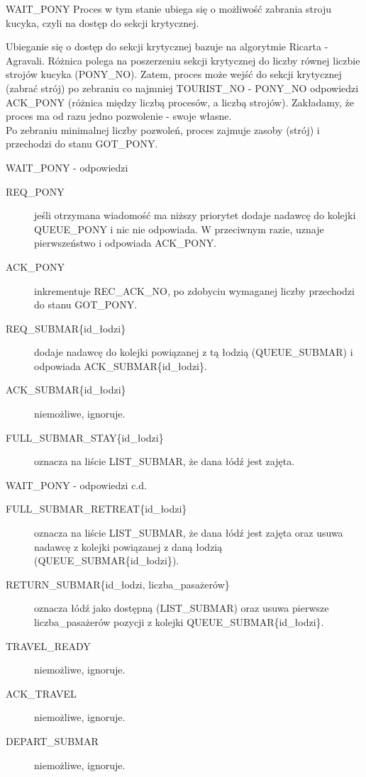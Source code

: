 \documentclass{beamer}
\begin{document}
\begin{frame}{WAIT\_PONY}
    \internallinenumbers
    \resetlinenumber[1]
    Proces w tym stanie ubiega się o  możliwość zabrania stroju kucyka, czyli na dostęp do sekcji krytycznej.

    \vspace{0.4cm}
    Ubieganie się o dostęp do sekcji krytycznej bazuje na algorytmie Ricarta - Agravali. Różnica polega na poszerzeniu sekcji krytycznej do liczby równej liczbie strojów kucyka (PONY\_NO). Zatem, proces może wejść do sekcji krytycznej (zabrać strój) po zebraniu co najmniej TOURIST\_NO - PONY\_NO odpowiedzi ACK\_PONY (różnica między liczbą procesów, a liczbą strojów). Zakładamy, że proces ma od razu jedno pozwolenie - swoje własne. \\
    Po zebraniu minimalnej liczby pozwoleń, proces zajmuje zasoby (strój) i przechodzi do stanu GOT\_PONY.
\end{frame}

\begin{frame}{WAIT\_PONY - odpowiedzi}
    \internallinenumbers
    \resetlinenumber[1]
    \begin{description}
        \item [REQ\_PONY] jeśli otrzymana wiadomość ma niższy priorytet dodaje nadawcę do kolejki QUEUE\_PONY i nic nie odpowiada. W przeciwnym razie, uznaje pierwszeństwo i odpowiada ACK\_PONY.
        \item [ACK\_PONY] inkrementuje REC\_ACK\_NO, po zdobyciu wymaganej liczby przechodzi do stanu GOT\_PONY.
        \item [REQ\_SUBMAR\{id\_łodzi\}] dodaje nadawcę do kolejki powiązanej z tą łodzią (QUEUE\_SUBMAR) i odpowiada ACK\_SUBMAR\{id\_łodzi\}.
        \item [ACK\_SUBMAR\{id\_łodzi\}] niemożliwe, ignoruje.
        \item [FULL\_SUBMAR\_STAY\{id\_łodzi\}] oznacza na liście LIST\_SUBMAR, że dana łódź jest zajęta.

    \end{description}
\end{frame}

\begin{frame}{WAIT\_PONY - odpowiedzi c.d.}
    \internallinenumbers
    \begin{description}
        \item [FULL\_SUBMAR\_RETREAT\{id\_łodzi\}] oznacza na liście LIST\_SUBMAR, że dana łódź jest zajęta oraz usuwa nadawcę z kolejki powiązanej z daną łodzią (QUEUE\_SUBMAR\{id\_łodzi\}).
        \item [RETURN\_SUBMAR\{id\_łodzi, liczba\_pasażerów\}] oznacza łódź jako dostępną (LIST\_SUBMAR) oraz usuwa pierwsze liczba\_pasażerów pozycji z kolejki QUEUE\_SUBMAR\{id\_łodzi\}.
        \item [TRAVEL\_READY] niemożliwe, ignoruje.
        \item [ACK\_TRAVEL] niemożliwe, ignoruje.
        \item [DEPART\_SUBMAR] niemożliwe, ignoruje.
    \end{description}
\end{frame}
\end{document}
